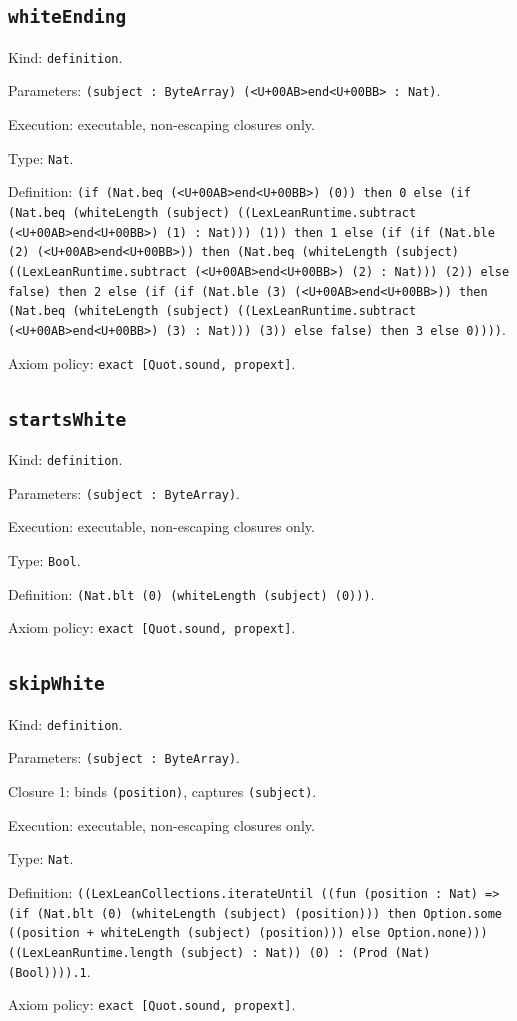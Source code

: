 \documentclass[11pt]{article}
\begin{document}
\subsection*{\texttt{whiteEnding}}
\noindent Kind: \texttt{definition}.\par
\noindent Parameters: \texttt{(subject : ByteArray) (<U+00AB>end<U+00BB> : Nat)}.\par
\noindent Execution: executable, non-escaping closures only.\par
\noindent Type: \texttt{Nat}.\par
\noindent Definition: \texttt{(if (Nat.beq (<U+00AB>end<U+00BB>) (0)) then 0 else (if (Nat.beq (whiteLength (subject) ((LexLeanRuntime.subtract (<U+00AB>end<U+00BB>) (1) : Nat))) (1)) then 1 else (if (if (Nat.ble (2) (<U+00AB>end<U+00BB>)) then (Nat.beq (whiteLength (subject) ((LexLeanRuntime.subtract (<U+00AB>end<U+00BB>) (2) : Nat))) (2)) else false) then 2 else (if (if (Nat.ble (3) (<U+00AB>end<U+00BB>)) then (Nat.beq (whiteLength (subject) ((LexLeanRuntime.subtract (<U+00AB>end<U+00BB>) (3) : Nat))) (3)) else false) then 3 else 0))))}.\par
\noindent Axiom policy: \texttt{exact [Quot.sound, propext]}.\par
\subsection*{\texttt{startsWhite}}
\noindent Kind: \texttt{definition}.\par
\noindent Parameters: \texttt{(subject : ByteArray)}.\par
\noindent Execution: executable, non-escaping closures only.\par
\noindent Type: \texttt{Bool}.\par
\noindent Definition: \texttt{(Nat.blt (0) (whiteLength (subject) (0)))}.\par
\noindent Axiom policy: \texttt{exact [Quot.sound, propext]}.\par
\subsection*{\texttt{skipWhite}}
\noindent Kind: \texttt{definition}.\par
\noindent Parameters: \texttt{(subject : ByteArray)}.\par
\noindent Closure 1: binds \texttt{(position)}, captures \texttt{(subject)}.\par
\noindent Execution: executable, non-escaping closures only.\par
\noindent Type: \texttt{Nat}.\par
\noindent Definition: \texttt{((LexLeanCollections.iterateUntil ((fun (position : Nat) => (if (Nat.blt (0) (whiteLength (subject) (position))) then Option.some ((position + whiteLength (subject) (position))) else Option.none))) ((LexLeanRuntime.length (subject) : Nat)) (0) : (Prod (Nat) (Bool)))).1}.\par
\noindent Axiom policy: \texttt{exact [Quot.sound, propext]}.\par
\end{document}
